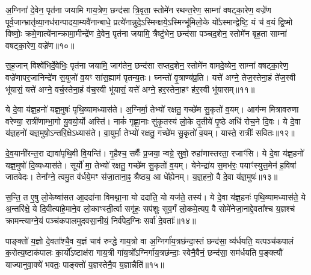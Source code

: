 अ॒ग्निना॑ दे॒वेन॒ पृत॑ना जयामि गाय॒त्रेण॒ छन्द॑सा त्रि॒वृता॒ स्तोमे॑न रथन्त॒रेण॒ साम्ना॑ वषट्का॒रेण॒ वज्रे॑ण पूर्व॒जान्भ्रातृ॑व्या॒नध॑रान्पादया॒म्यवै॑नान्बाधे॒ प्रत्ये॑नान्नुदे॒\-ऽस्मिन्क्षये॒\-ऽस्मिन्भू॑मिलो॒के यो᳚\-ऽस्मान्द्वेष्टि॒ यं च॑ व॒यं द्वि॒ष्मो विष्णोः॒ क्रमे॒णात्ये॑नान्क्रामा॒मीन्द्रे॑ण दे॒वेन॒ पृत॑ना जयामि॒ त्रैष्टु॑भेन॒ छन्द॑सा पञ्चद॒शेन॒ स्तोमे॑न बृह॒ता साम्ना॑ वषट्का॒रेण॒ वज्रे॑ण॥१०॥

स॒ह॒जान् विश्वे॑भिर्दे॒वेभिः॒ पृत॑ना जयामि॒ जाग॑तेन॒ छन्द॑सा सप्तद॒शेन॒ स्तोमे॑न वामदे॒व्येन॒ साम्ना॑ वषट्का॒रेण॒ वज्रे॑णापर॒जानिन्द्रे॑ण स॒युजो॑ व॒यꣳ सा॑स॒ह्याम॑ पृतन्य॒तः। घ्नन्तो॑ वृ॒त्राण्य॑प्र॒ति। यत्ते॑ अग्ने॒ तेज॒स्तेना॒हं ते॑ज॒स्वी भू॑यासं॒ यत्ते॑ अग्ने॒ वर्च॒स्तेना॒हं व॑च॒स्वी भू॑यासं॒ यत्ते॑ अग्ने॒ हर॒स्तेना॒हꣳ ह॑र॒स्वी भू॑यासम्॥११॥

{}

ये दे॒वा य॑ज्ञ॒हनो॑ यज्ञ॒मुषः॑ पृथि॒व्यामध्यास॑ते। अ॒ग्निर्मा॒ तेभ्यो॑ रक्षतु॒ गच्छे॑म सु॒कृतो॑ व॒यम्। आग॑न्म मित्रावरुणा वरेण्या॒ रात्री॑णाम्भा॒गो यु॒वयो॒र्यो अस्ति॑। नाकं॑ गृह्णा॒नाः सु॑कृ॒तस्य॑ लो॒के तृ॒तीये॑ पृ॒ष्ठे अधि॑ रोच॒ने दि॒वः। ये दे॒वा य॑ज्ञ॒हनो॑ यज्ञ॒मुषो॒\-ऽन्तरि॒क्षे\-ऽध्यास॑ते। वा॒युर्मा॒ तेभ्यो॑ रक्षतु॒ गच्छे॑म सु॒कृतो॑ व॒यम्। यास्ते॒ रात्रीः᳚ सवितः॥१२॥

दे॒व॒यानी॑रन्त॒रा द्यावा॑पृथि॒वी वि॒यन्ति॑। गृ॒हैश्च॒ सर्वैः᳚ प्र॒जया॒ न्वग्रे॒ सुवो॒ रुहा॑णास्तरता॒ रजाꣳ॑सि। ये दे॒वा य॑ज्ञ॒हनो॑ यज्ञ॒मुषो॑ दि॒व्यध्यास॑ते। सूर्यो॑ मा॒ तेभ्यो॑ रक्षतु॒ गच्छे॑म सु॒कृतो॑ व॒यम्। येनेन्द्रा॑य स॒मभ॑रः॒ पयाꣳ॑स्युत्त॒\-मेन॑ ह॒विषा॑ जातवेदः। तेना᳚ग्ने॒ त्वमु॒त व॑र्धये॒मꣳ स॑जा॒ताना॒ꣴ॒ श्रैष्ठ्य॒ आ धे᳚ह्येनम्। य॒ज्ञ॒हनो॒ वै दे॒वा य॑ज्ञ॒मुषः॑॥१३॥

स॒न्ति॒ त ए॒षु लो॒केष्वा॑सत आ॒ददा॑ना विमथ्ना॒ना यो ददा॑ति॒ यो यज॑ते॒ तस्य॑। ये दे॒वा य॑ज्ञ॒हनः॑ पृथि॒व्यामध्यास॑ते॒ ये अ॒न्तरि॑क्षे॒ ये दि॒वीत्या॑हे॒माने॒व लो॒काꣳस्ती॒र्त्वा सगृ॑हः॒ सप॑शुः सुव॒र्गं लो॒कमे॒त्यप॒ वै सोमे॑नेजा॒नाद्दे॒वता᳚श्च य॒ज्ञश्च॑ क्रामन्त्याग्ने॒यं पञ्च॑कपालमुदवसा॒नीयं॒ निर्व॑पेद॒ग्निः सर्वा॑ दे॒वताः᳚॥१४॥

पाङ्क्तो॑ य॒ज्ञो दे॒वता᳚श्चै॒व य॒ज्ञं चाव॑ रुन्द्धे गाय॒त्रो वा अ॒ग्निर्गा॑य॒त्रछ॑न्दा॒स्तं छन्द॑सा॒ व्य॑र्धयति॒ यत्पञ्च॑कपालं क॒रोत्य॒ष्टाक॑पालः का॒र्यो᳚\-ऽष्टाक्ष॑रा गाय॒त्री गा॑य॒त्रो᳚\-ऽग्निर्गा॑य॒त्रछ॑न्दाः॒ स्वेनै॒वैनं॒ छन्द॑सा॒ सम॑र्धयति प॒ङ्क्त्यौ॑ याज्यानुवा॒क्ये॑ भवतः॒ पाङ्क्तो॑ य॒ज्ञस्तेनै॒व य॒ज्ञान्नैति॑॥१५॥

{\anuvakamend[{स॒वि॒त॒र्दे॒वा य॑ज्ञ॒मुषः॒ सर्वा॑ दे॒वता॒स्त्रिच॑त्वारिꣳशच्च॥४॥}]}

